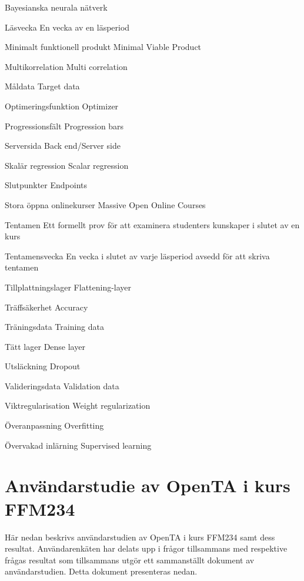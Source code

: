 \begin{labeling}{Bayesianska neurala nätverk}
\item [Läsvecka]    En vecka av en läsperiod
\item [Minimalt funktionell produkt]	Minimal Viable Product
\item [Multikorrelation]	Multi correlation
\item [Måldata]	Target data
\item [Optimeringsfunktion]	Optimizer
\item [Progressionsfält]	Progression bars
\item [Serversida]	Back end/Server side
\item [Skalär regression]	Scalar regression
\item [Slutpunkter]	Endpoints
\item [Stora öppna onlinekurser]	Massive Open Online Courses
\item [Tentamen]    Ett formellt prov för att examinera studenters kunskaper i slutet av en kurs
\item [Tentamensvecka]  En vecka i slutet av varje läsperiod avsedd för att skriva tentamen
\item [Tillplattningslager]	Flattening-layer
\item [Träffsäkerhet]	Accuracy
\item [Träningsdata]	Training data
\item [Tätt lager]	Dense layer
\item [Utsläckning]	Dropout
\item [Valideringsdata]	Validation data
\item [Viktregularisation]	Weight regularization
\item [Överanpassning]	Overfitting
\item [Övervakad inlärning]	Supervised learning
\end{labeling}


\section{Användarstudie av OpenTA i kurs FFM234}
\label{app:opentasurvey}


Här nedan beskrivs användarstudien av OpenTA i kurs FFM234 samt dess resultat. Användarenkäten har delats upp i frågor tillsammans med respektive frågas resultat som tillsammans utgör ett sammanställt dokument av användarstudien. Detta dokument presenteras nedan. 



